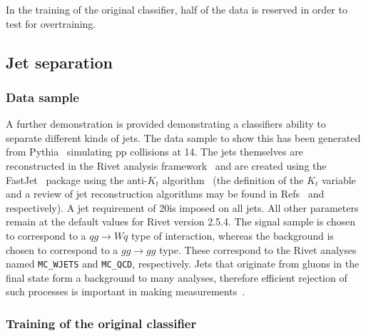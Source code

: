 In the training of the original classifier, half of the data is
reserved in order to test for overtraining.


\subsection{Jet separation}
\label{sec:hepGPD}

\subsubsection{Data sample}

A further demonstration is provided demonstrating a classifiers ability to separate different
kinds of jets. The data sample to show this has been generated from Pythia~\cite{Sjostrand:2007gs}
simulating pp collisions at 14\tev.
The jets themselves are reconstructed in the Rivet analysis framework~\cite{Buckley:2010ar}
and are created using the FastJet~\cite{Cacciari:2011ma} package using the anti-$K_t$ algorithm~\cite{Salam:2007xv}
(the definition
of the $K_t$ variable and a review of jet reconstruction algorithms
may be found in Refs~\cite{kt} and \cite{Atkin:2015msa} respectively).
A jet \pt requirement of 20\gev is imposed on all jets.
All other parameters remain at the default values for Rivet version 2.5.4.
The signal sample is chosen to correspond to a $qg\to Wq$ type of interaction,
whereas the background is chosen to correspond to a $gg \to gg$ type. These correspond
to the Rivet analyses named {\tt MC\_WJETS} and {\tt MC\_QCD}, respectively.
Jets that originate from gluons in the final state form a background to many
analyses, therefore efficient rejection of such processes is important in making
measurements~\cite{Komiske:2016rsd}.

\subsubsection{Training of the original classifier}


